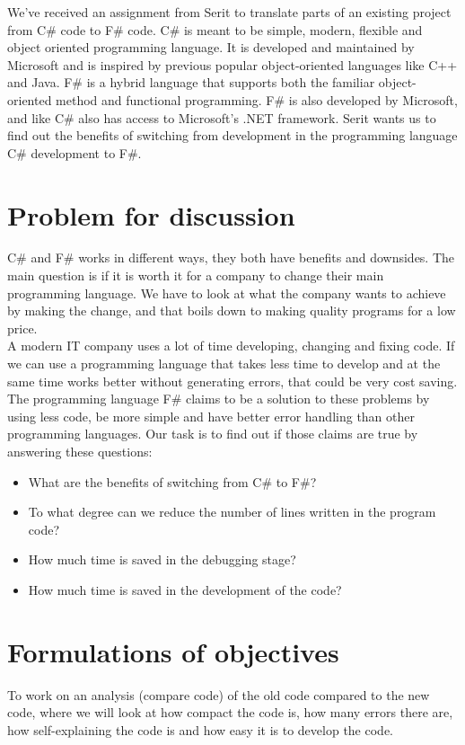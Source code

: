 \documentclass[12pt, a4paper]{article}
\begin{document}
We've received an assignment from Serit to translate parts of an existing project from C\# code to F\# code. C\# is meant to be simple, modern, flexible and object oriented programming language. It  is developed and maintained by Microsoft and is inspired by previous popular object-oriented languages like C++ and Java. F\# is a hybrid language that supports both the familiar object-oriented method and functional programming. F\# is also developed by Microsoft, and like C\# also has access to Microsoft’s .NET framework. Serit wants us to find out the benefits of  switching from development in the programming language C\# development to F\#.\\

\newpage
\section{Problem for discussion}
C\# and F\# works in different ways, they both have benefits and downsides. The main question is if it is worth it for a company to change their main programming language. We have to look at what the company wants to achieve by making the change, and that boils down to making quality programs for a low price. \\

A modern IT company uses a lot of time developing, changing and fixing code. If we can use a programming language that takes less time to develop and at the same time works better without generating errors, that could be very cost saving.\\

The programming language F\# claims to be a solution to these problems by using less code, be more simple and have better error handling than other programming languages. Our task is to find out if those claims are true by answering these questions:

\begin{itemize}
\item What are the benefits of switching from C\# to F\#?
\item To what degree can we reduce the number of lines written in the program code?
\item How much time is saved in the debugging stage?
\item How much time is saved in the development of the code?
\end{itemize}

\newpage

\section{Formulations of objectives}
To work on an analysis (compare code) of the old code compared to the new code, where we will look at how compact the code is, how many errors there are, how self-explaining the code is and how easy it is to develop the code.
\end{document}
